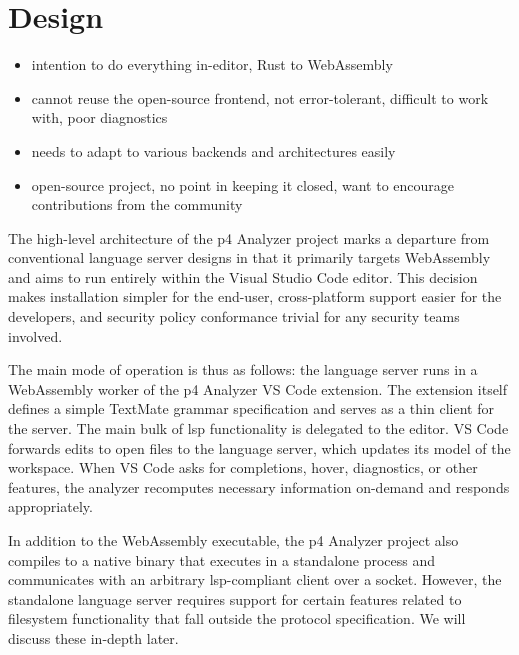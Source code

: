 \chapter{Design}


\begin{itemize}
	\item intention to do everything in-editor, Rust to WebAssembly
	\item cannot reuse the open-source frontend, not error-tolerant, difficult
	to work with, poor diagnostics
	\item needs to adapt to various backends and architectures easily
	\item open-source project, no point in keeping it closed, want to encourage
	contributions from the community
\end{itemize}

The high-level architecture of the \acrshort{p4} Analyzer project marks a
departure from conventional language server designs in that it primarily targets
WebAssembly and aims to run entirely within the Visual Studio Code editor. This
decision makes installation simpler for the end-user, cross-platform support
easier for the developers, and security policy conformance trivial for any
security teams involved.

The main mode of operation is thus as follows: the language server runs in a
WebAssembly worker of the \acrshort{p4} Analyzer VS Code extension. The
extension itself defines a simple TextMate grammar specification
and serves as a thin client for the server. The main bulk of \acrshort{lsp}
functionality is delegated to the editor. VS Code forwards edits to open files
to the language server, which updates its model of the workspace. When VS Code
asks for completions, hover, diagnostics, or other features, the analyzer
recomputes necessary information on-demand and responds appropriately.

In addition to the WebAssembly executable, the \acrshort{p4} Analyzer project
also compiles to a native binary that executes in a standalone process and
communicates with an arbitrary \acrshort{lsp}-compliant client over a socket.
However, the standalone language server requires support for certain features
related to filesystem functionality that fall outside the protocol
specification. We will discuss these in-depth later.

